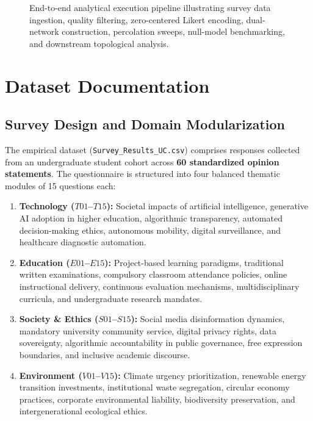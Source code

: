 \documentclass[10pt,twocolumn,a4paper]{article}
\begin{document}
\begin{figure}[t]
\caption{End-to-end analytical execution pipeline illustrating survey data ingestion, quality filtering, zero-centered Likert encoding, dual-network construction, percolation sweeps, null-model benchmarking, and downstream topological analysis.}
\label{fig:pipeline_tikz}
\end{figure}

\section{Dataset Documentation}
\label{sec:dataset}

\subsection{Survey Design and Domain Modularization}
The empirical dataset (\texttt{Survey\_Results\_UC.csv}) comprises responses collected from an undergraduate student cohort across \textbf{60 standardized opinion statements}. The questionnaire is structured into four balanced thematic modules of 15 questions each:
\begin{enumerate}[noitemsep,topsep=1pt,leftmargin=1.2em]
    \item \textbf{Technology ($T01$--$T15$):} Societal impacts of artificial intelligence, generative AI adoption in higher education, algorithmic transparency, automated decision-making ethics, autonomous mobility, digital surveillance, and healthcare diagnostic automation.
    \item \textbf{Education ($E01$--$E15$):} Project-based learning paradigms, traditional written examinations, compulsory classroom attendance policies, online instructional delivery, continuous evaluation mechanisms, multidisciplinary curricula, and undergraduate research mandates.
    \item \textbf{Society \& Ethics ($S01$--$S15$):} Social media disinformation dynamics, mandatory university community service, digital privacy rights, data sovereignty, algorithmic accountability in public governance, free expression boundaries, and inclusive academic discourse.
    \item \textbf{Environment ($V01$--$V15$):} Climate urgency prioritization, renewable energy transition investments, institutional waste segregation, circular economy practices, corporate environmental liability, biodiversity preservation, and intergenerational ecological ethics.
\end{enumerate}
\end{document}
